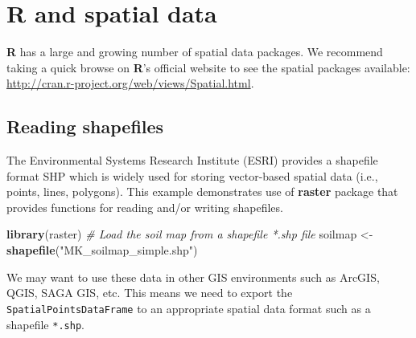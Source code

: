 \documentclass[10pt,b5paper,]{book}
\newenvironment{Shaded}{\begin{snugshade}}{\end{snugshade}}
\newcommand{\CommentTok}[1]{\textcolor[rgb]{0.56,0.35,0.01}{\textit{#1}}}
\newcommand{\DataTypeTok}[1]{\textcolor[rgb]{0.13,0.29,0.53}{#1}}
\newcommand{\KeywordTok}[1]{\textcolor[rgb]{0.13,0.29,0.53}{\textbf{#1}}}
\newcommand{\NormalTok}[1]{#1}
\newcommand{\OperatorTok}[1]{\textcolor[rgb]{0.81,0.36,0.00}{\textbf{#1}}}
\newcommand{\OtherTok}[1]{\textcolor[rgb]{0.56,0.35,0.01}{#1}}
\newcommand{\StringTok}[1]{\textcolor[rgb]{0.31,0.60,0.02}{#1}}
\theoremstyle{definition}
\theoremstyle{definition}
\theoremstyle{definition}
\theoremstyle{remark}
\begin{document}
\hypertarget{r-and-spatial-data}{%
\section{R and spatial data}\label{r-and-spatial-data}}

\textbf{R} has a large and growing number of spatial data packages. We
recommend taking a quick browse on \textbf{R}'s official website to see
the spatial packages available:
\url{http://cran.r-project.org/web/views/Spatial.html}.

\hypertarget{reading-shapefiles}{%
\subsection{Reading shapefiles}\label{reading-shapefiles}}

The Environmental Systems Research Institute (ESRI) provides a shapefile
format SHP which is widely used for storing vector-based spatial data
(i.e., points, lines, polygons). This example demonstrates use of
\textbf{raster} package that provides functions for reading and/or
writing shapefiles.

\begin{Shaded}
\begin{Highlighting}[]
\KeywordTok{library}\NormalTok{(raster)}
\CommentTok{# Load the soil map from a shapefile *.shp file}
\NormalTok{soilmap <-}\StringTok{ }\KeywordTok{shapefile}\NormalTok{(}\StringTok{"MK_soilmap_simple.shp"}\NormalTok{)}
\end{Highlighting}
\end{Shaded}

We may want to use these data in other GIS environments such as ArcGIS,
QGIS, SAGA GIS, etc. This means we need to export the
\texttt{SpatialPointsDataFrame} to an appropriate spatial data format
such as a shapefile \texttt{*.shp}.

\begin{Shaded}
\end{Shaded}
\end{document}
